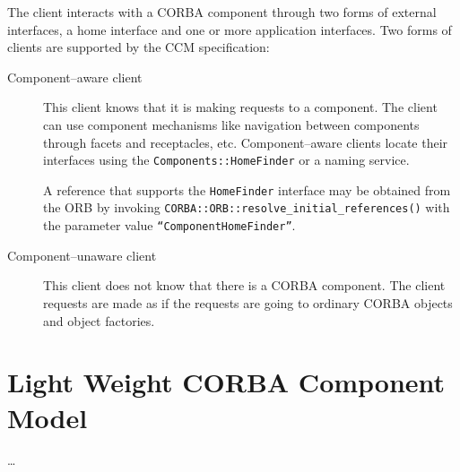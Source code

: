 The client interacts with a CORBA component through two forms of external
interfaces, a home interface and one or more application interfaces. Two forms
of clients are supported by the CCM specification:

\begin{description}
\item [Component--aware client]
This client knows that it is making requests to a component. The client can use
component mechanisms like navigation between components through facets and
receptacles, etc. Component--aware clients locate their interfaces using the
{\tt Components::HomeFinder} or a naming service.

A reference that supports the {\tt HomeFinder} interface may be obtained from
the ORB by invoking {\tt CORBA::ORB::resolve\_initial\_references()} with the
parameter value {\tt ``ComponentHomeFinder''}.

\item [Component--unaware client]
This client does not know that there is a CORBA component. The client requests
are made as if the requests are going to ordinary CORBA objects and object
factories.
\end{description}


\section{Light Weight CORBA Component Model}

\dots